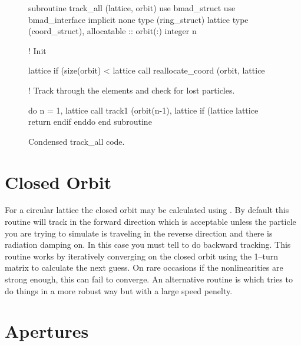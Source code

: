 {{{{{\begin{figure}[htb]
\begin{centering}
\small
\begin{listing}{1}
  subroutine track_all (lattice, orbit)
    use bmad_struct
    use bmad_interface
    implicit none
    type (ring_struct)  lattice
    type (coord_struct), allocatable :: orbit(:)
    integer n

  ! Init

    lattice%
    if (size(orbit) < lattice%
                    call reallocate_coord (orbit, lattice%

  ! Track through the elements and check for lost particles.

    do n = 1, lattice%
      call track1 (orbit(n-1), lattice%
      if (lattice%
        lattice%
        return
      endif
    enddo
  end subroutine
\end{listing}
\caption{Condensed track\_all code.}
\end{centering}
\label{f:track_all}
\end{figure}

\section{Closed Orbit}

For a circular lattice the closed orbit may be calculated using
. By default this routine will track in the
forward direction which is acceptable unless the particle you are
trying to simulate is traveling in the reverse direction and there is
radiation damping on. In this case you must tell
 to do backward tracking. This routine works by
iteratively converging on the closed orbit using the 1--turn matrix to
calculate the next guess. On rare occasions if the nonlinearities are
strong enough, this can fail to converge. An alternative routine is
 which tries to do things in a more
robust way but with a large speed penelty.

\section{Apertures}

}}}}}
